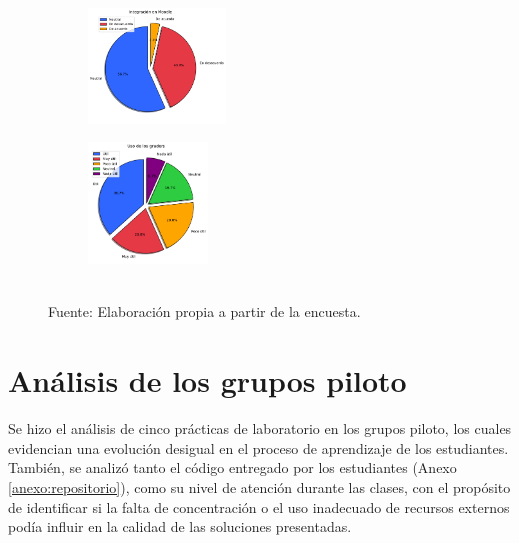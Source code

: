 \documentclass[letter,oneside,12pt,spanish]{report}
\begin{document}
\begin{figure}[h]
	\centering
    \begin{subfigure}
        \centering
        \includegraphics[width=0.4\textwidth]{Figs/integracion_moodle.pdf}
    \end{subfigure}
	\hfill
    \begin{subfigure}
        \centering
        \includegraphics[width=0.35\textwidth]{Figs/uso_graders.pdf}
    \end{subfigure}
	\label{fig:MG}
	\\ Fuente: Elaboración propia a partir de la encuesta.
\end{figure}

\newpage

\section{Análisis de los grupos piloto}

Se hizo el análisis de cinco prácticas de laboratorio en los grupos piloto, los cuales evidencian una evolución desigual en el proceso de aprendizaje de los estudiantes. También, se analizó tanto el código entregado por los estudiantes (Anexo \ref{anexo:repositorio}), como su nivel de atención durante las clases, con el propósito de identificar si la falta de concentración o el uso inadecuado de recursos externos podía influir en la calidad de las soluciones presentadas. 
\end{document}
